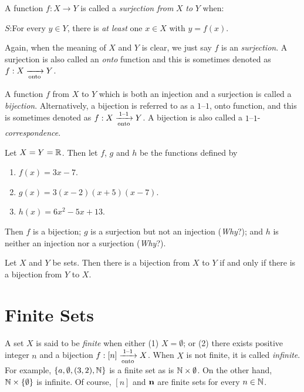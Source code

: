 A function $f:X\rightarrow Y$ is called a \textit{surjection from}
$X$ \textit{to} $Y$ when:

\medskip
\noindent
$S$:\quad For every $y\in Y$, there is \textit{at least} one $x\in X$ with
$y=f(x)$.

\medskip
Again, when the meaning of $X$ and $Y$ is clear, we just say $f$ is an 
\textit{surjection}.  A surjection is also called an \textit{onto} 
function and this is sometimes denoted as\\
$f:X\xrightarrow[\text{onto}]{} Y$.

A function $f$ from $X$ to $Y$ which is both an injection and a surjection
is called a \textit{bijection}.  Alternatively, a bijection is referred
to as a $1$--$1$, onto function, and this is sometimes denoted as
$f:X \xrightarrow[\text{onto}]{\text{$1$--$1$}} Y$.  A bijection is also called a 
$1$--$1$-\textit{correspondence}.

\begin{example}
Let $X=Y=\mathbb{R}$.  Then let $f$, $g$ and $h$ be the
functions defined by

\begin{enumerate}
\item $f(x)=3x-7$.
\item $g(x)=3(x-2)(x+5)(x-7)$.
\item $h(x)=6x^2-5x+13$.
\end{enumerate}
Then $f$ is a bijection; $g$ is a surjection but not an
injection (\textit{Why}?); and $h$ is neither an injection nor a
surjection (\textit{Why}?).
\end{example}

\begin{proposition}
Let $X$ and $Y$ be sets. Then there is a bijection from $X$ to $Y$
if and only if there is a bijection from $Y$ to $X$.
\end{proposition}

\section{Finite Sets}\label{s:background:finite-sets}

A set $X$ is said to be \textit{finite} when either (1) $X=\emptyset$; or
(2) there exists positive integer $n$ and a bijection $f:[n]\xrightarrow[\text{onto}]{\text{$1$--$1$}} X$.
When $X$ is not finite, it is called \textit{infinite}.  For example,
$\{a,\emptyset,(3,2),\mathbb{N}\}$ is a finite set as is
$\mathbb{N}\times\emptyset$.  On the other hand, $\mathbb{N}\times
\{\emptyset\}$ is infinite.  Of course, $[n]$ and $\mathbf{n}$ are
finite sets for every $n\in\mathbb{N}$.

